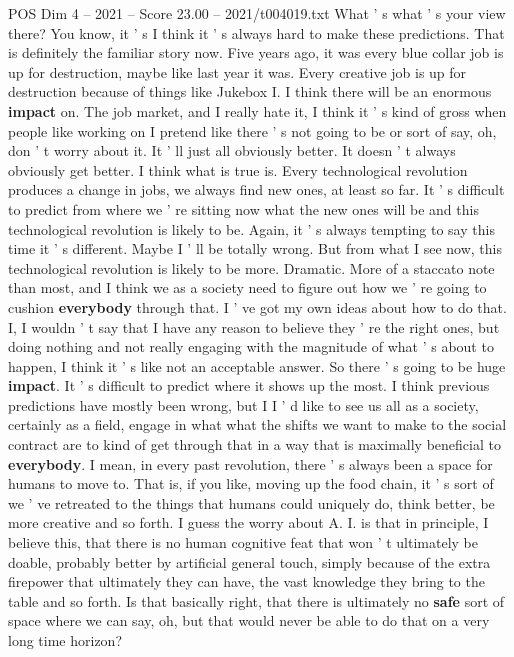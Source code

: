\begin{textsample}{POS Dim 4 – 2021 – Score 23.00 – 2021/t004019.txt}
What ' s what ' s your view there?
You know, it ' s I think it ' s always hard to make these predictions.
That is definitely the familiar story now.
Five years ago, it was every blue collar job is up for destruction, maybe like last year it was.
Every creative job is up for destruction because of things like Jukebox I.
I think there will be an enormous \textbf{impact} on.
The job market, and I really hate it, I think it ' s kind of gross when people like working on I pretend like there ' s not going to be or sort of say, oh, don ' t worry about it.
It ' ll just all obviously better.
It doesn ' t always obviously get better.
I think what is true is.
Every technological revolution produces a change in jobs, we always find new ones, at least so far.
It ' s difficult to predict from where we ' re sitting now what the new ones will be and this technological revolution is likely to be.
Again, it ' s always tempting to say this time it ' s different.
Maybe I ' ll be totally wrong.
But from what I see now, this technological revolution is likely to be more.
Dramatic.
More of a staccato note than most, and I think we as a society need to figure out how we ' re going to cushion \textbf{everybody} through that.
I ' ve got my own ideas about how to do that.
I, I wouldn ' t say that I have any reason to believe they ' re the right ones, but doing nothing and not really engaging with the magnitude of what ' s about to happen, I think it ' s like not an acceptable answer.
So there ' s going to be huge \textbf{impact}.
It ' s difficult to predict where it shows up the most.
I think previous predictions have mostly been wrong, but I I ' d like to see us all as a society, certainly as a field, engage in what what the shifts we want to make to the social contract are to kind of get through that in a way that is maximally beneficial to \textbf{everybody}.
I mean, in every past revolution, there ' s always been a space for humans to move to.
That is, if you like, moving up the food chain, it ' s sort of we ' ve retreated to the things that humans could uniquely do, think better, be more creative and so forth.
I guess the worry about A.
I. is that in principle, I believe this, that there is no human cognitive feat that won ' t ultimately be doable, probably better by artificial general touch, simply because of the extra firepower that ultimately they can have, the vast knowledge they bring to the table and so forth.
Is that basically right, that there is ultimately no \textbf{safe} sort of space where we can say, oh, but that would never be able to do that on a very long time horizon?

\end{textsample}
